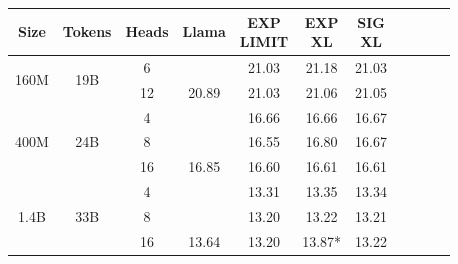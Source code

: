 \begin{tabular}{ccc|cccccccc}
    \toprule
    Size                  & Tokens               & Heads & Llama & \thead{EXP                  \\ LIMIT} & \thead{EXP \\ XL} & \thead{SIG \\ XL} \\
    \midrule
    \multirow{2}{*}{160M} & \multirow{2}{*}{19B} & 6     &      & 21.03      & 21.18  & 21.03 \\
                          &                      & 12    & 20.89    & 21.03      & 21.06  & 21.05 \\
    \midrule
    \multirow{3}{*}{400M} & \multirow{3}{*}{24B} & 4     &      & 16.66      & 16.66  & 16.67 \\
                          &                      & 8     &      & 16.55      & 16.80  & 16.67 \\
                          &                      & 16    & 16.85    & 16.60      & 16.61  & 16.61 \\
    \midrule
    \multirow{3}{*}{1.4B} & \multirow{3}{*}{33B} & 4     &      & 13.31      & 13.35  & 13.34 \\
                          &                      & 8     &      & 13.20      & 13.22  & 13.21 \\
                          &                      & 16    & 13.64    & 13.20      & 13.87* & 13.22 \\
    \bottomrule
\end{tabular}
